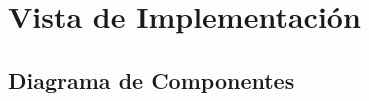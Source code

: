\section{Vista de Implementación} \label{vistaImplementacion}
    
\subsection{Diagrama de Componentes}